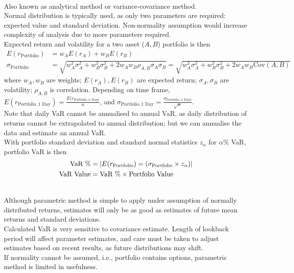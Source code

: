 \begin{method} \\
Also known as analytical method or variance-covariance method.\\
Normal distribution is typically used, as only two parameters are required: expected value and standard deviation. Non-normality assumption would increase complexity of analysis due to more parameters required.\\
Expected return and volatility for a two asset ($A, B$) portfolio is then
\begin{align}
E(r_{\text{Portfolio}}) &= w_A E(r_A) + w_B E(r_B) \nonumber \\
\sigma_{\text{Portfolio}} &= \sqrt{w_A^2 \sigma_A^2 + w_B^2 \sigma_B^2 + 2 w_A w_B \rho_{A,B} \sigma_A \sigma_B} = \sqrt{w_A^2 \sigma_A^2 + w_B^2 \sigma_B^2 + 2 w_A w_B \text{Cov}(A,B)} \nonumber
\end{align}
where $w_A, w_B$ are weights; $E(r_A), E(r_B)$ are expected return; $\sigma_A, \sigma_B$ are volatility; $\rho_{A,B}$ is correlation.
Depending on time frame, $E(r_{\text{Portfolio}, 1 \text{ Day}}) = \frac{E(r_{\text{Portfolio}, n \text{ Days}}}{n}$, and $\sigma_{\text{Portfolio}, 1 \text{ Day}} = \frac{\sigma_{\text{Portfolio}, n \text{ Days}}}{\sqrt{n}}$.\\
Note that daily VaR cannot be annualised to annual VaR, as daily distribution of returns cannot be extrapolated to annual distribution; but we can annualise the data and estimate an annual VaR.\\
With portfolio standard deviation and standard normal statistics $z_{\alpha}$ for $\alpha \% $ VaR, portfolio VaR is then
\begin{align}
\text{VaR } \% &= \left\lvert E(r_{\text{Portfolio}}) = (\sigma_{\text{Portfolio}} \times z_{\alpha})\right\rvert \nonumber \\
\text{VaR Value} &= \text{VaR } \% \times \text{Portfolio Value} \nonumber
\end{align}
\end{method}

\begin{remark} \\
Although parametric method is simple to apply under assumption of normally distributed returns, estimates will only be as good as estimates of future mean returns and standard deviations.\\
Calculated VaR is very sensitive to covariance estimate. Length of lookback period will affect parameter estimates, and care must be taken to adjust estimates based on recent results, as future distributions may shift.\\
If normality cannot be assumed, i.e., portfolio contains options, parametric method is limited in usefulness.
\end{remark}


